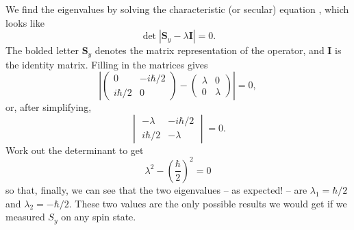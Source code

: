 We find the eigenvalues by solving the characteristic (or secular) equation , which looks like
\begin{equation}
\det | \textbf{S}_y - \lambda \textbf{I} | = 0.
\end{equation}
The bolded letter $\textbf{S}_y$ denotes the matrix representation of the operator, and $\textbf{I}$ is the identity matrix.  Filling in the matrices gives
\[
\left| \begin{pmatrix} 0 & -i\hbar/2 \\ i\hbar/2 & 0  \end{pmatrix} - \begin{pmatrix} \lambda &  0 \\ 0 & \lambda \end{pmatrix} \right| = 0,
\]
or, after simplifying,
\[
\begin{vmatrix} -\lambda & -i\hbar/2 \\ i\hbar/2 & -\lambda  \end{vmatrix} = 0.
\]
Work out the determinant to get
\[
\lambda^2 - \left( \frac{\hbar}{2} \right)^2 = 0
\]
so that, finally, we can see that the two eigenvalues -- as expected! -- are $\lambda_1 = \hbar/2$ and $\lambda_2 = -\hbar/2$.  These two values are the only possible results we would get if we measured $S_y$ on any spin state.

